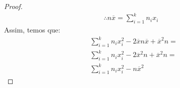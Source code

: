 \begin{parts}
\begin{solution}
\begin{proof}
\begin{equation*}
\begin{split}
                    \therefore n\overline{x} = \sum^{k}_{i=1}{n_ix_i}
                \end{split}
            \end{equation*}
            Assim, temos que:
            \begin{equation*}
                \begin{split}
                     & \sum^{k}_{i=1}{n_ix^2_i} - 2\overline{x}n\overline{x} + \overline{x}^2n = \\
                     & \sum^{k}_{i=1}{n_ix^2_i} - 2\overline{x}^2n + \overline{x}^2n =           \\
                     & \sum^{k}_{i=1}{n_ix^2_i} - n\overline{x}^2
                \end{split}
            \end{equation*}
        \end{proof}
    \end{solution}


\end{parts}
